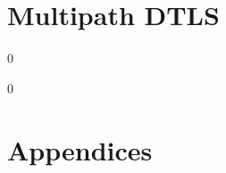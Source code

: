 \documentclass[11pt,a4paper,oldfontcommands]{memoir}
\newcommand\draft{0}
\begin{document}
\markboth{}{}
\part{Multipath DTLS}
\fi
\draft
\fi




\draft

\markboth{}{}
\part*{Appendices}

\appendix



\fi
\end{document}
